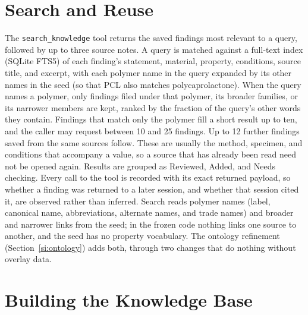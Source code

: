 \documentclass[journal=mamobx,manuscript=suppinfo]{achemso}
\newcommand{\code}[1]{\texttt{#1}}
\begin{document}
\section{Search and Reuse}
\label{si:search}

The \code{search\_knowledge} tool returns the saved findings most relevant to a query, followed by up to three source notes.
A query is matched against a full-text index (SQLite FTS5) of each finding's statement, material, property, conditions, source title, and excerpt, with each polymer name in the query expanded by its other names in the seed (so that PCL also matches polycaprolactone).
When the query names a polymer, only findings filed under that polymer, its broader families, or its narrower members are kept, ranked by the fraction of the query's other words they contain.
Findings that match only the polymer fill a short result up to ten, and the caller may request between 10 and 25 findings.
Up to 12 further findings saved from the same sources follow.
These are usually the method, specimen, and conditions that accompany a value, so a source that has already been read need not be opened again.
Results are grouped as Reviewed, Added, and Needs checking.
Every call to the tool is recorded with its exact returned payload, so whether a finding was returned to a later session, and whether that session cited it, are observed rather than inferred.
Search reads polymer names (label, canonical name, abbreviations, alternate names, and trade names) and broader and narrower links from the seed; in the frozen code nothing links one source to another, and the seed has no property vocabulary.
The ontology refinement (Section~\ref{si:ontology}) adds both, through two changes that do nothing without overlay data.

\section{Building the Knowledge Base}
\label{si:build}
\end{document}
